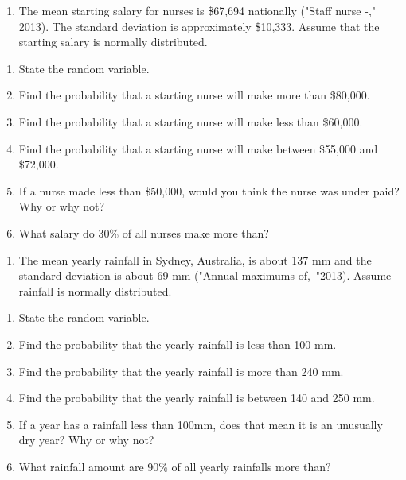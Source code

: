 \documentclass[]{book}
\providecommand{\tightlist}{%
  \setlength{\itemsep}{0pt}\setlength{\parskip}{0pt}}
\begin{document}
\begin{enumerate}
\def\labelenumi{\arabic{enumi}.}
\setcounter{enumi}{8}
\tightlist
\item
  The mean starting salary for nurses is \$67,694 nationally ("Staff nurse -," 2013). The standard deviation is approximately \$10,333. Assume that the starting salary is normally distributed.
\end{enumerate}

\begin{enumerate}
\def\labelenumi{\alph{enumi}.}
\tightlist
\item
  State the random variable.
\item
  Find the probability that a starting nurse will make more than \$80,000.
\item
  Find the probability that a starting nurse will make less than \$60,000.
\item
  Find the probability that a starting nurse will make between \$55,000 and \$72,000.
\item
  If a nurse made less than \$50,000, would you think the nurse was under paid? Why or why not?
\item
  What salary do 30\% of all nurses make more than?
\end{enumerate}

\begin{enumerate}
\def\labelenumi{\arabic{enumi}.}
\setcounter{enumi}{9}
\tightlist
\item
  The mean yearly rainfall in Sydney, Australia, is about 137 mm and the standard deviation is about 69 mm ("Annual maximums of,~"2013). Assume rainfall is normally distributed.
\end{enumerate}

\begin{enumerate}
\def\labelenumi{\alph{enumi}.}
\tightlist
\item
  State the random variable.
\item
  Find the probability that the yearly rainfall is less than 100 mm.
\item
  Find the probability that the yearly rainfall is more than 240 mm.
\item
  Find the probability that the yearly rainfall is between 140 and 250 mm.
\item
  If a year has a rainfall less than 100mm, does that mean it is an unusually dry year? Why or why not?
\item
  What rainfall amount are 90\% of all yearly rainfalls more than?
\end{enumerate}
\end{document}
